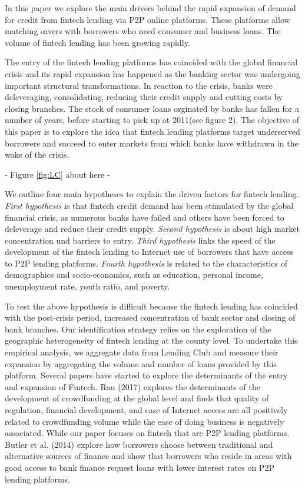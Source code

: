 \documentclass[11pt, a4paper, leqno]{article}
\begin{document}
In this paper we explore the main drivers behind the rapid expansion of demand for credit from fintech lending via P2P online platforms. These platforms allow matching savers with borrowers who need consumer and business loans. The volume of fintech lending has been growing rapidly.  

The entry of the fintech lending platforms has coincided with the global financial crisis and its rapid expansion has happened as the banking sector was undergoing important structural transformations. In reaction to the crisis, banks were deleveraging, consolidating, reducing their credit supply and cutting costs by closing branches. The stock of consumer loans orginated by banks has fallen for a number of years, before starting to pick up at 2011(see figure 2). The objective of this paper is to explore the idea that fintech lending platforms target underserved borrowers and succeed to enter markets from which banks have withdrawn in the wake of the crisis.  

\begin{center}
- Figure \ref{fig:LC} about here -
\end{center}

We outline four main hypotheses to explain the driven factors for fintech lending. 
\textit{First hypothesis} is that fintech credit demand has been stimulated by the global financial crisis, as numerous banks have failed and others have been forced to deleverage and reduce their credit supply. \textit{Second hypothesis} is about high market concentration und barriers to entry.  \textit{Third hypothesis} links the speed of the development of the fintech lending to Internet use of borrowers that have access to P2P lending platforms. \textit{Fourth hypothesis} is related to the characteristics of demographics and socio-economics, such as education, personal income, unemployment rate, youth ratio, and poverty.

To test the above hypothesis is difficult because the fintech lending has coincided with the post-crisis period, increased concentration of bank sector and closing of bank branches. Our identification strategy relies on the exploration of the geographic heterogeneity of fintech lending at the county level. To undertake this empirical analysis, we aggregate data from Lending Club and measure their expansion by aggregating the volume and number of loans provided by this platform. 
Several papers have started to explore the determinants of the entry and expansion of Fintech. Rau (2017) explores the determinants of the development of crowdfunding at the global level and finds that quality of regulation, financial development, and ease of Internet access are all positively related to crowdfunding volume while the ease of doing business is negatively associated. While our paper focuses on fintech that are P2P lending platforms. Butler et al. (2014) explore how borrowers choose between traditional and alternative sources of finance and show that borrowers who reside in areas with good access to bank finance request loans with lower interest rates on P2P lending platforms.
\end{document}
